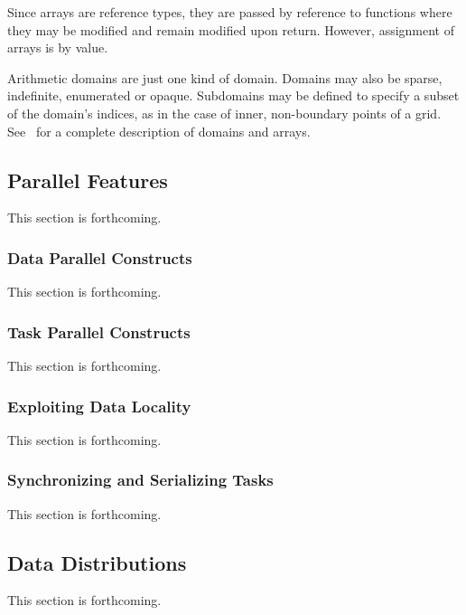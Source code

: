 Since arrays are reference types, they are passed by reference to functions
where they may be modified and remain modified upon return.  However, assignment
of arrays is by value.

Arithmetic domains are just one kind of domain.  Domains may
also be sparse, indefinite, enumerated or opaque.  Subdomains may be
defined to specify a subset of the domain's indices, as in the case of
inner, non-boundary points of a grid.  See~ for
a complete description of domains and arrays.
 
\subsection{Parallel Features}
\label{Parallel_Features}

This section is forthcoming.


\subsubsection{Data Parallel Constructs}
\label{Data_Parallel_Constructs}

This section is forthcoming.


\subsubsection{Task Parallel Constructs}
\label{Task_Parallel_Constructs}

This section is forthcoming.


\subsubsection{Exploiting Data Locality}
\label{Exploiting_Data_Locality}

This section is forthcoming.


\subsubsection{Synchronizing and Serializing Tasks}
\label{Synchronizing_and_Serializing_Tasks}

This section is forthcoming.


\subsection{Data Distributions}
\label{Data_Distributions}

This section is forthcoming.


